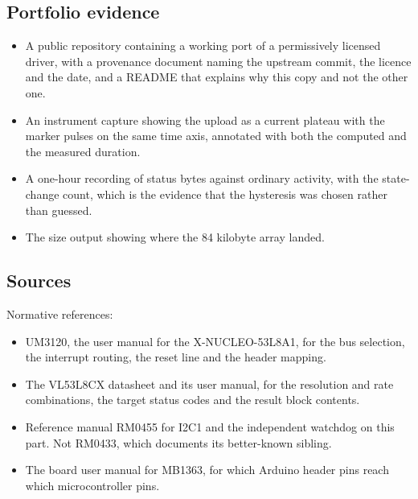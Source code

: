 \subsection*{Portfolio evidence}

\begin{itemize}
\item A public repository containing a working port of a permissively licensed
driver, with a provenance document naming the upstream commit, the licence and
the date, and a README that explains why this copy and not the other one.
\item An instrument capture showing the upload as a current plateau with the
marker pulses on the same time axis, annotated with both the computed and the
measured duration.
\item A one-hour recording of status bytes against ordinary activity, with the
state-change count, which is the evidence that the hysteresis was chosen rather
than guessed.
\item The size output showing where the 84 kilobyte array landed.
\end{itemize}

\subsection*{Sources}

Normative references:
\begin{itemize}
\item UM3120, the user manual for the X-NUCLEO-53L8A1, for the bus selection,
the interrupt routing, the reset line and the header mapping.
\item The VL53L8CX datasheet and its user manual, for the resolution and rate
combinations, the target status codes and the result block contents.
\item Reference manual RM0455 for I2C1 and the independent watchdog on this
part. Not RM0433, which documents its better-known sibling.
\item The board user manual for MB1363, for which Arduino header pins reach
which microcontroller pins.
\end{itemize}

